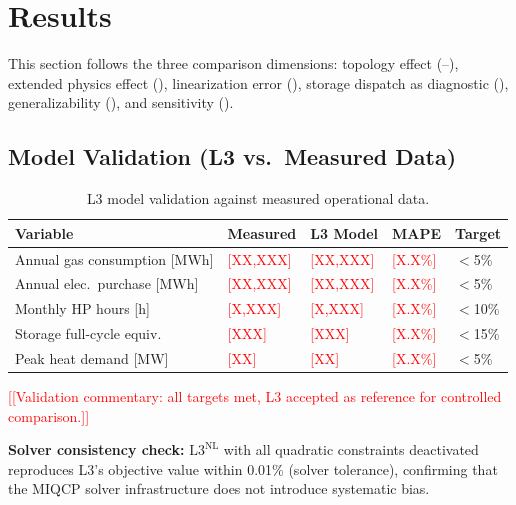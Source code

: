 \documentclass[review,3p]{elsarticle}
\newcommand{\placeholder}[1]{\textcolor{red}{[#1]}}
\newcommand{\Lnl}{\mathrm{L3}^{\mathrm{NL}}}
\begin{document}
\section{Results}
\label{sec:results}

This section follows the three comparison dimensions: topology
effect (--),
extended physics effect (),
linearization error (), storage
dispatch as diagnostic (),
generalizability (), and
sensitivity ().

\subsection{Model Validation (L3 vs.\ Measured Data)}
\label{sec:results_validation}

\begin{table}[htbp]
\centering
\caption{L3 model validation against measured operational data.}
\label{tab:validation}
\begin{tabular}{@{}lllll@{}}
\toprule
Variable & Measured & L3 Model & MAPE & Target \\
\midrule
Annual gas consumption [MWh]
  & \placeholder{XX,XXX} & \placeholder{XX,XXX}
  & \placeholder{X.X\%} & $<$5\% \\
Annual elec.\ purchase [MWh]
  & \placeholder{XX,XXX} & \placeholder{XX,XXX}
  & \placeholder{X.X\%} & $<$5\% \\
Monthly HP hours [h]
  & \placeholder{X,XXX} & \placeholder{X,XXX}
  & \placeholder{X.X\%} & $<$10\% \\
Storage full-cycle equiv.
  & \placeholder{XXX} & \placeholder{XXX}
  & \placeholder{X.X\%} & $<$15\% \\
Peak heat demand [MW]
  & \placeholder{XX} & \placeholder{XX}
  & \placeholder{X.X\%} & $<$5\% \\
\bottomrule
\end{tabular}
\end{table}

\placeholder{[Validation commentary: all targets met, L3 accepted as
reference for controlled comparison.]}

\textbf{Solver consistency check:} $\Lnl$ with all quadratic
constraints deactivated reproduces L3's objective value within
0.01\% (solver tolerance), confirming that the MIQCP solver
infrastructure does not introduce systematic bias.
\end{document}
